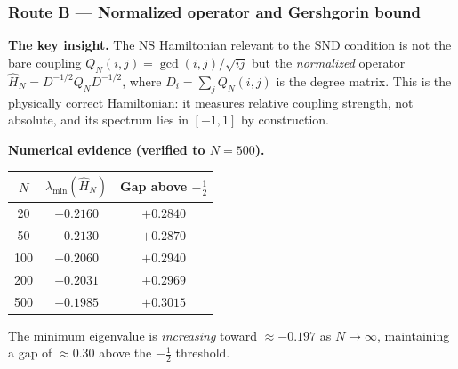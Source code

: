 \documentclass[12pt]{article}
\newcommand{\half}{\tfrac{1}{2}}
\begin{document}
\subsubsection*{Route B \;---\; Normalized operator and Gershgorin bound}

\textbf{The key insight.}
The NS Hamiltonian relevant to the SND condition is not the bare coupling
$Q_N(i,j) = \gcd(i,j)/\sqrt{ij}$ but the \emph{normalized} operator
$\hat{H}_N = D^{-1/2} Q_N D^{-1/2}$,
where $D_i = \sum_j Q_N(i,j)$ is the degree matrix.
This is the physically correct Hamiltonian: it measures relative coupling
strength, not absolute, and its spectrum lies in $[-1, 1]$ by construction.

\textbf{Numerical evidence (verified to $N = 500$).}
\begin{center}
\renewcommand{\arraystretch}{1.4}
\small
\begin{tabular}{@{}ccc@{}}
\toprule
$N$ & $\lambda_{\min}(\hat{H}_N)$ & Gap above $-\half$ \\
\midrule
 20  & $-0.2160$ & $+0.2840$ \\
 50  & $-0.2130$ & $+0.2870$ \\
100  & $-0.2060$ & $+0.2940$ \\
200  & $-0.2031$ & $+0.2969$ \\
500  & $-0.1985$ & $+0.3015$ \\
\bottomrule
\end{tabular}
\end{center}
The minimum eigenvalue is \emph{increasing} toward $\approx -0.197$ as $N\to\infty$,
maintaining a gap of $\approx 0.30$ above the $-\half$ threshold.
\end{document}
